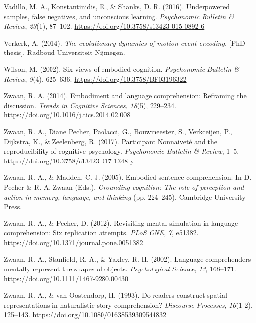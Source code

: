 \documentclass[
  man,floatsintext]{apa7}
\newlength{\cslhangindent}
\newlength{\cslentryspacingunit} %
\newenvironment{CSLReferences}[2] %
 {%
  \setlength{\parindent}{0pt}
  \ifodd #1
  \let\oldpar\par
  \def\par{\hangindent=\cslhangindent\oldpar}
  \fi
  \setlength{\parskip}{#2\cslentryspacingunit}
 }%
 {}
\begin{document}
\begin{CSLReferences}{1}{0}
\leavevmode{}%
Vadillo, M. A., Konstantinidis, E., \& Shanks, D. R. (2016). Underpowered samples, false negatives, and unconscious learning. \emph{Psychonomic Bulletin \& Review}, \emph{23}(1), 87--102. \url{https://doi.org/10.3758/s13423-015-0892-6}

\leavevmode{}%
Verkerk, A. (2014). \emph{The evolutionary dynamics of motion event encoding.} {[}PhD thesis{]}. Radboud Universiteit Nijmegen.

\leavevmode{}%
Wilson, M. (2002). Six views of embodied cognition. \emph{Psychonomic Bulletin \& Review}, \emph{9}(4), 625--636. \url{https://doi.org/10.3758/BF03196322}

\leavevmode{}%
Zwaan, R. A. (2014). Embodiment and language comprehension: Reframing the discussion. \emph{Trends in Cognitive Sciences}, \emph{18}(5), 229--234. \url{https://doi.org/10.1016/j.tics.2014.02.008}

\leavevmode{}%
Zwaan, R. A., Diane Pecher, Paolacci, G., Bouwmeester, S., Verkoeijen, P., Dijkstra, K., \& Zeelenberg, R. (2017). Participant {Nonnaiveté} and the reproducibility of cognitive psychology. \emph{Psychonomic Bulletin \& Review}, 1--5. \url{https://doi.org/10.3758/s13423-017-1348-y}

\leavevmode{}%
Zwaan, R. A., \& Madden, C. J. (2005). Embodied sentence comprehension. In D. Pecher \& R. A. Zwaan (Eds.), \emph{Grounding cognition: {The} role of perception and action in memory, language, and thinking} (pp. 224--245). {Cambridge University Press}.

\leavevmode{}%
Zwaan, R. A., \& Pecher, D. (2012). Revisiting mental simulation in language comprehension: Six replication attempts. \emph{PLoS ONE}, \emph{7}, e51382. \url{https://doi.org/10.1371/journal.pone.0051382}

\leavevmode{}%
Zwaan, R. A., Stanfield, R. A., \& Yaxley, R. H. (2002). Language comprehenders mentally represent the shapes of objects. \emph{Psychological Science}, \emph{13}, 168--171. \url{https://doi.org/10.1111/1467-9280.00430}

\leavevmode{}%
Zwaan, R. A., \& van Oostendorp, H. (1993). Do readers construct spatial representations in naturalistic story comprehension? \emph{Discourse Processes}, \emph{16}(1-2), 125--143. \url{https://doi.org/10.1080/01638539309544832}

\end{CSLReferences}
\end{document}
